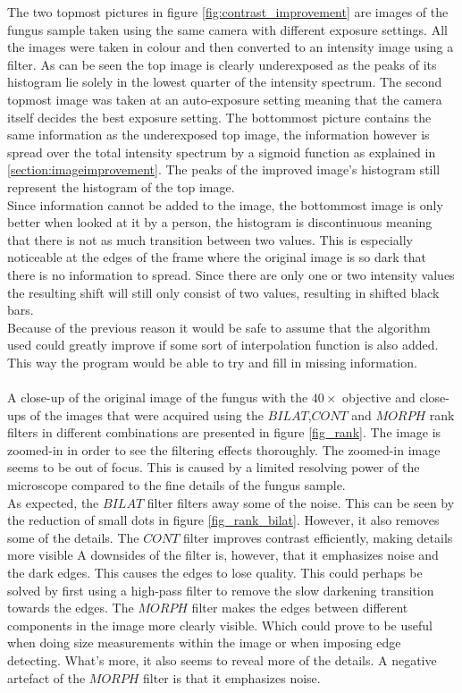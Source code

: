 The two topmost pictures in figure \ref{fig:contrast_improvement} are images of the fungus sample taken using the same camera with different exposure settings. All the images were taken in colour and then converted to an intensity image using a filter. As can be seen the top image is clearly underexposed as the peaks of its histogram lie solely in the lowest quarter of the intensity spectrum. The second topmost image was taken at an auto-exposure setting meaning that the camera itself decides the best exposure setting. The bottommost picture contains the same information as the underexposed top image, the information however is spread over the total intensity spectrum by a sigmoid function as explained in \ref{section:imageimprovement}. The peaks of the improved image's histogram still represent the histogram of the top image.\\
Since information cannot be added to the image, the bottommost image is only better when looked at it by a person, the histogram is discontinuous meaning that there is not as much transition between two values. This is especially noticeable at the edges of the frame where the original image is so dark that there is no information to spread. Since there are only one or two intensity values the resulting shift will still only consist of two values, resulting in shifted black bars.\\
Because of the previous reason it would be safe to assume that the algorithm used could greatly improve if some sort of interpolation function is also added. This way the program would be able to try and fill in missing information.\\
\\
A close-up of the original image of the fungus with the $40 \times$ objective  and close-ups of the images that were acquired using the $BILAT$,$CONT$ and $MORPH$ rank filters in different combinations are presented in figure \ref{fig_rank}. The image is zoomed-in in order to see the filtering effects thoroughly. The zoomed-in image seems to be out of focus. This is caused by a limited resolving power of the microscope compared to the fine details of the fungus sample.\\
As expected, the $BILAT$ filter filters away some of the noise. This can be seen by the reduction of small dots in figure \ref{fig_rank_bilat}. However, it also removes some of the details. The $CONT$ filter improves contrast efficiently, making details more visible A downsides of the filter is, however, that it emphasizes noise and the dark edges. This causes the edges to lose quality. This could perhaps be solved by first using a high-pass filter to remove the slow darkening transition towards the edges. The $MORPH$ filter makes the edges between different components in the image more clearly visible. Which could prove to be useful when doing size measurements within the image or when imposing edge detecting. What's more, it also seems to reveal more of the details. A negative artefact of the $MORPH$ filter is that it emphasizes noise. \\
